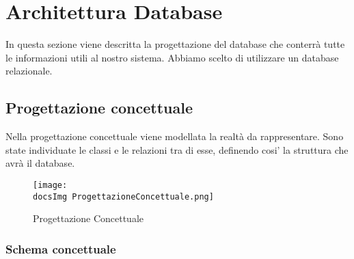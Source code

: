 \section{Architettura Database}{
	In questa sezione viene descritta la progettazione del database che conterrà tutte le informazioni utili al nostro sistema. Abbiamo scelto di utilizzare un database relazionale.
	
	\subsection{Progettazione concettuale}{
		Nella progettazione concettuale viene modellata la realtà da rappresentare. Sono state individuate le classi e le relazioni tra di esse, definendo cosi' la struttura che avrà il database.
		
		\begin{figure}[ht]
				\texttt{[image: \\docsImg ProgettazioneConcettuale.png]}
				\caption{Progettazione Concettuale}
				\label{Fig. Progettazione Concettuale}
		\end{figure}
			
			\subsubsection{Schema concettuale}
			
}}
